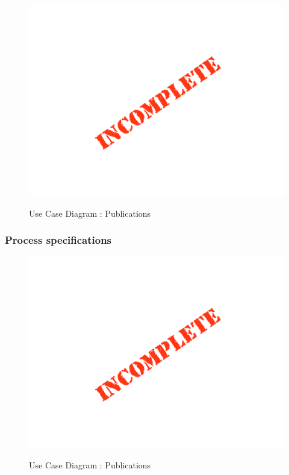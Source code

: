 \documentclass{article}
\begin{document}
	\begin{figure}[H]
	\includegraphics[width=\textwidth]{images/Incomplete.png}  \\
	\caption{Use Case Diagram : Publications}
	\end{figure}

	\subsubsection{Process specifications}

	\begin{figure}[H]
	\includegraphics[width=\textwidth]{images/Incomplete.png}  \\
	\caption{Use Case Diagram : Publications}
	\end{figure}
\end{document}
